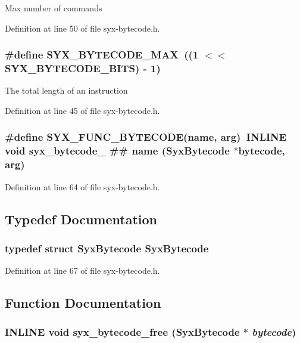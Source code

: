 Max number of commands 

Definition at line 50 of file syx-bytecode.h.\hypertarget{syx-bytecode_8h_f343d91f1534f8a23d607daea1c345c5}{
\subsubsection{\setlength{\rightskip}{0pt plus 5cm}\#define SYX\_\-BYTECODE\_\-MAX~((1 $<$$<$ SYX\_\-BYTECODE\_\-BITS) - 1)}}
\label{syx-bytecode_8h_f343d91f1534f8a23d607daea1c345c5}


The total length of an instruction 

Definition at line 45 of file syx-bytecode.h.\hypertarget{syx-bytecode_8h_70a15bed0a327462ec2fc007522c8cae}{
\subsubsection{\setlength{\rightskip}{0pt plus 5cm}\#define SYX\_\-FUNC\_\-BYTECODE(name, \/  arg)~INLINE void syx\_\-bytecode\_\- \#\# name ({\bf SyxBytecode} $\ast$bytecode, arg)}}
\label{syx-bytecode_8h_70a15bed0a327462ec2fc007522c8cae}




Definition at line 64 of file syx-bytecode.h.

\subsection{Typedef Documentation}
\hypertarget{syx-bytecode_8h_ddefdc0e904f306046ea2d02b89f5f97}{
\subsubsection{\setlength{\rightskip}{0pt plus 5cm}typedef struct {\bf SyxBytecode} {\bf SyxBytecode}}}
\label{syx-bytecode_8h_ddefdc0e904f306046ea2d02b89f5f97}




Definition at line 67 of file syx-bytecode.h.

\subsection{Function Documentation}
\hypertarget{syx-bytecode_8h_0a5a5bc160ebdb86668efd589066c390}{
\subsubsection{\setlength{\rightskip}{0pt plus 5cm}INLINE void syx\_\-bytecode\_\-free ({\bf SyxBytecode} $\ast$ {\em bytecode})}}
\label{syx-bytecode_8h_0a5a5bc160ebdb86668efd589066c390}


